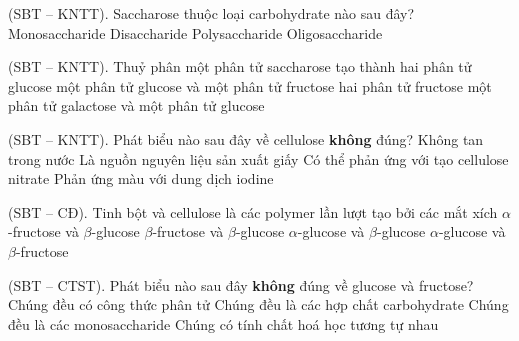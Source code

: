 \documentclass[12pt,a4paper]{article}
\begin{document}
\begin{ex}
(SBT -- KNTT). Saccharose thuộc loại carbohydrate nào sau đây?
\choice
{Monosaccharide}
{\True Disaccharide}
{Polysaccharide}
{Oligosaccharide}
\end{ex}

\begin{ex}
(SBT -- KNTT). Thuỷ phân một phân tử saccharose tạo thành
\choice
{hai phân tử glucose}
{\True một phân tử glucose và một phân tử fructose}
{hai phân tử fructose}
{một phân tử galactose và một phân tử glucose}
\end{ex}

\begin{ex}
(SBT -- KNTT). Phát biểu nào sau đây về cellulose \textbf{không} đúng?
\choice
{Không tan trong nước}
{Là nguồn nguyên liệu sản xuất giấy}
{Có thể phản ứng với  tạo cellulose nitrate}
{\True Phản ứng màu với dung dịch iodine}
\end{ex}

\begin{ex}
(SBT -- CĐ). Tinh bột và cellulose là các polymer lần lượt tạo bởi các mắt xích
\choice
{$\alpha$-fructose và $\beta$-glucose}
{$\beta$-fructose và $\beta$-glucose}
{\True $\alpha$-glucose và $\beta$-glucose}
{$\alpha$-glucose và $\beta$-fructose}
\end{ex}

\begin{ex}
(SBT -- CTST). Phát biểu nào sau đây \textbf{không} đúng về glucose và fructose?
\choice
{Chúng đều có công thức phân tử }
{Chúng đều là các hợp chất carbohydrate}
{Chúng đều là các monosaccharide}
{\True Chúng có tính chất hoá học tương tự nhau}
\end{ex}
\end{document}
